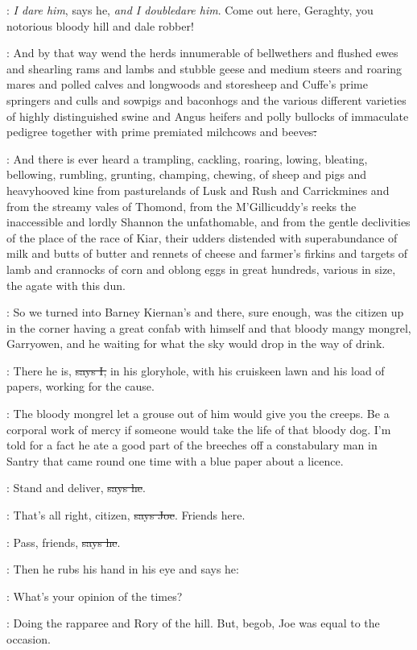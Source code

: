 \Nq:
\emph{I dare him}, says he, \emph{and I doubledare him}.
Come out here, Geraghty,
you notorious bloody hill and dale robber!

:
And by that way wend the herds innumerable of bellwethers and
flushed ewes and shearling rams and lambs and stubble geese and medium
steers and roaring mares and polled calves and longwoods and storesheep
and Cuffe's prime springers and culls and sowpigs and baconhogs and the
various different varieties of highly distinguished swine and Angus
heifers and polly bullocks of immaculate pedigree together with prime
premiated milchcows and beeves\sout{:}

:
And there is ever heard a trampling,
cackling, roaring, lowing, bleating, bellowing, rumbling, grunting,
champing, chewing, of sheep and pigs and heavyhooved kine from
pasturelands of Lusk and Rush and Carrickmines and from the streamy vales
of Thomond, from the M'Gillicuddy's reeks the inaccessible and lordly
Shannon the unfathomable, and from the gentle declivities of the place of
the race of Kiar, their udders distended with superabundance of milk and
butts of butter and rennets of cheese and farmer's firkins and targets of
lamb and crannocks of corn and oblong eggs in great hundreds, various in
size, the agate with this dun.

\Nq:
So we turned into Barney Kiernan's and there, sure enough, was the citizen
up in the corner having a great confab with himself and that bloody
mangy mongrel, Garryowen, and he waiting for what the sky would drop
in the way of drink.

:
There he is, \sout{says I,}
in his gloryhole, with his cruiskeen lawn and his
load of papers, working for the cause.

\Nq:
The bloody mongrel let a grouse out of him would give you the creeps.  Be
a corporal work of mercy if someone would take the life of that
bloody dog. I'm told for a fact he ate a good part of the breeches off a
constabulary man in Santry that came round one time with a blue paper
about a licence.

\citizen:
Stand and deliver, \sout{says he}.

\joe:
That's all right, citizen, \sout{says Joe}. Friends here.

\citizen:
Pass, friends, \sout{says he}.

\Nq:
Then he rubs his hand in his eye and says he:

\citizen:
What's your opinion of the times?

\Nq:
Doing the rapparee and Rory of the hill. But, begob, Joe was equal to
the occasion.

